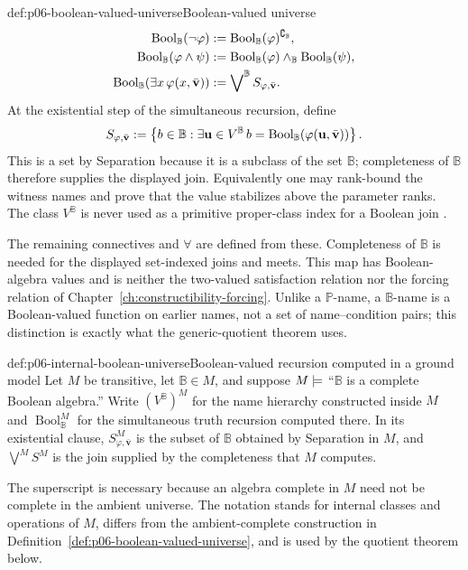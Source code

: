 \begin{hbdefinition}{def:p06-boolean-valued-universe}{Boolean-valued universe}
\[\begin{aligned}
 \operatorname{Bool}_{\mathbb B}(\neg\varphi)
   &\mathrel{:=}
     \operatorname{Bool}_{\mathbb B}(\varphi)^{\complement_{\mathbb B}},\\
 \operatorname{Bool}_{\mathbb B}(\varphi\wedge\psi)
   &\mathrel{:=}\operatorname{Bool}_{\mathbb B}(\varphi)\wedge_{\mathbb B}
       \operatorname{Bool}_{\mathbb B}(\psi),\\
 \operatorname{Bool}_{\mathbb B}(\exists x\,\varphi(x,\bar{\mathbf v}))
   &\mathrel{:=}\mathop{\bigvee}\nolimits^{\mathbb B}
       S_{\varphi,\bar{\mathbf v}}.
\end{aligned}
\]
At the existential step of the simultaneous recursion, define
\[
 S_{\varphi,\bar{\mathbf v}}
 \mathrel{:=}
 \left\{b\in\mathbb B:
   \exists\mathbf u\in V^{\mathbb B}\,
   b=\operatorname{Bool}_{\mathbb B}
      (\varphi(\mathbf u,\bar{\mathbf v}))\right\}.
\]
This is a set by Separation because it is a subclass of the set
\(\mathbb B\); completeness of \(\mathbb B\) therefore supplies the displayed
join.  Equivalently one may rank-bound the witness names and prove that the
value stabilizes above the parameter ranks.  The class
\(V^{\mathbb B}\) is never used as a primitive proper-class index for a
Boolean join \cite{ScottSolovay1967,Bell2005}.

The remaining connectives and \(\forall\) are defined from these.  Completeness
of \(\mathbb B\) is needed for the displayed set-indexed joins and meets.  This map has
Boolean-algebra values and is neither the two-valued satisfaction relation nor
the forcing relation of Chapter~\ref{ch:constructibility-forcing}.  Unlike
a \(\mathbb P\)-name, a \(\mathbb B\)-name is a Boolean-valued function on
earlier names, not a set of name--condition pairs; this distinction is exactly
what the generic-quotient theorem uses.
\end{hbdefinition}

\begin{hbconvention}{def:p06-internal-boolean-universe}{Boolean-valued recursion computed in a ground model}
Let \(M\) be transitive, let \(\mathbb B\in M\), and suppose
\(M\models\) “\(\mathbb B\) is a complete Boolean algebra.”  Write
\((V^{\mathbb B})^M\) for the name hierarchy constructed inside \(M\) and
\(\operatorname{Bool}_{\mathbb B}^M\) for the simultaneous truth recursion
computed there.  In its existential clause,
\(S_{\varphi,\bar{\mathbf v}}^M\) is the subset of \(\mathbb B\) obtained by
Separation in \(M\), and \(\bigvee^M S^M\) is the join supplied by the
completeness that \(M\) computes.

The superscript is necessary because an algebra complete in \(M\) need not be
complete in the ambient universe.  The notation stands for internal classes
and operations of \(M\), differs from the ambient-complete construction in
Definition~\ref{def:p06-boolean-valued-universe}, and is used by the quotient
theorem below.
\end{hbconvention}

